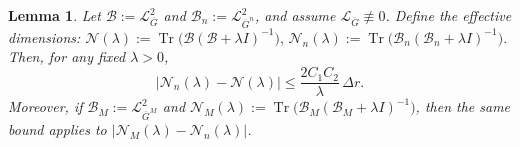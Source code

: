\documentclass[12pt]{article}
\def\Gbar{ {\overline{G}} }
\newtheorem{lemma}[theorem]{Lemma}
\numberwithin{equation}{section}
\numberwithin{theorem}{section}
\begin{document}
\begin{lemma}\label{lem:diff-effdim}
Let $\mathcal{B} := \mathcal{L}_{\Gbar}^2$ and $\mathcal{B}_n := \mathcal{L}_{\Gbar^n}^2$, and assume 
$\mathcal{L}_{\Gbar}\not\equiv 0$. Define the effective dimensions: $ \mathcal{N}(\lambda) := \operatorname{Tr}\bigl(\mathcal{B}(\mathcal{B}+\lambda I)^{-1}\bigr),\, \mathcal{N}_n(\lambda) := \operatorname{Tr}\bigl(\mathcal{B}_n(\mathcal{B}_n+\lambda I)^{-1}\bigr).$ Then, for any fixed $\lambda>0$,
$$
\bigl|\mathcal{N}_n(\lambda)-\mathcal{N}(\lambda)\bigr|
\le \frac{2 C_1 C_2}{\lambda}\,\Delta r.
$$
Moreover, if $\mathcal{B}_M := \mathcal{L}_{\Gbar^M}^2$ and $\mathcal{N}_M(\lambda) := \operatorname{Tr}\bigl(\mathcal{B}_M(\mathcal{B}_M+\lambda I)^{-1}\bigr)$, then the same bound applies to $\bigl|\mathcal{N}_M(\lambda)-\mathcal{N}_n(\lambda)\bigr|$.
\end{lemma}
\end{document}
